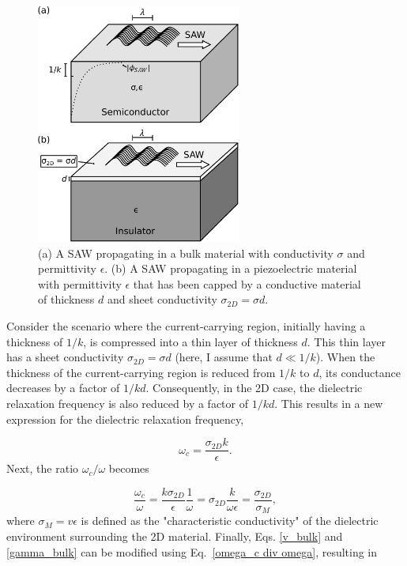\documentclass[double,12pt,1in,seploa]{beavtex}
\begin{document}
\begin{figure}
    \includegraphics[width = 0.6\textwidth]{SAW in thin film.pdf}
    \caption{(a) A SAW propagating in a bulk material with conductivity $\sigma$ and permittivity $\epsilon$. (b) A SAW propagating in a piezoelectric material with permittivity $\epsilon$ that has been capped by a conductive material of thickness $d$ and sheet conductivity $\sigma_{2D} = \sigma d$.}
    \label{SAW in thin film}
\end{figure}

Consider the scenario where the current-carrying region, initially having a thickness of $1/k$, is compressed into a thin layer of thickness $d$. This thin layer has a sheet conductivity $\sigma_{2D} = \sigma d$ (here, I assume that $d \ll 1/k$). When the thickness of the current-carrying region is reduced from $1/k$ to $d$, its conductance decreases by a factor of $1/kd$. Consequently, in the 2D case, the dielectric relaxation frequency is also reduced by a factor of $1/kd$. This results in a new expression for the dielectric relaxation frequency, 

\begin{equation}
    \omega_c = \frac{\sigma_{2D}k}{\epsilon}.
\end{equation}
Next, the ratio $\omega_c/\omega$ becomes

\begin{equation}
    \frac{\omega_c}{\omega} = \frac{k\sigma_{2D}}{\epsilon}\frac{1}{\omega} = \sigma_{2D}\frac{k}{\omega \epsilon} = \frac{\sigma_{2D}}{\sigma_M}, \label{omega_c div omega}
\end{equation}
where $\sigma_M = v \epsilon$ is defined as the "characteristic conductivity" of the dielectric environment surrounding the 2D material. Finally, Eqs. \ref{v_bulk} and \ref{gamma_bulk} can be modified using Eq.\ \ref{omega_c div omega}, resulting in 
\end{document}
